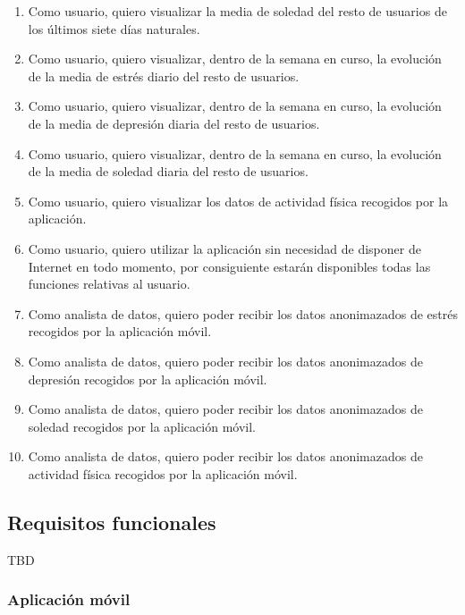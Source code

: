 \begin{enumerate}[label=\textbf{\texttt{RU-\arabic*}}]
            \item Como usuario, quiero visualizar la media de soledad del resto de usuarios de los últimos siete días naturales.
            \item Como usuario, quiero visualizar, dentro de la semana en curso, la evolución de la media de estrés diario del resto de usuarios.
            \item Como usuario, quiero visualizar, dentro de la semana en curso, la evolución de la media de depresión diaria del resto de usuarios.
            \item Como usuario, quiero visualizar, dentro de la semana en curso, la evolución de la media de soledad diaria del resto de usuarios.
            \item Como usuario, quiero visualizar los datos de actividad física recogidos por la aplicación.
            \item Como usuario, quiero utilizar la aplicación sin necesidad de disponer de Internet en todo momento, por consiguiente estarán disponibles todas las funciones relativas al usuario.
            \item Como analista de datos, quiero poder recibir los datos anonimazados de estrés recogidos por la aplicación móvil.
            \item Como analista de datos, quiero poder recibir los datos anonimazados de depresión recogidos por la aplicación móvil.
            \item Como analista de datos, quiero poder recibir los datos anonimazados de soledad recogidos por la aplicación móvil.
            \item Como analista de datos, quiero poder recibir los datos anonimazados de actividad física recogidos por la aplicación móvil.
        \end{enumerate}
    
    \subsection{Requisitos funcionales}
        TBD

        \subsubsection{Aplicación móvil}

